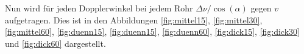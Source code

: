   \begin{table}
    \centering
    \caption{Messdaten und -ergebnisse für das $\SI{16}{\milli\metre}$-Rohr.}
    \label{tab:dick}
    \noindent{}
   \end{table}
Nun wird für jeden Dopplerwinkel bei jedem Rohr $\Delta\nu/\cos(\alpha)$ gegen $v$ aufgetragen.
Dies ist in den Abbildungen \ref{fig:mittel15}, \ref{fig:mittel30}, \ref{fig:mittel60}, \ref{fig:duenn15}, \ref{fig:duenn15}, \ref{fig:duenn60},
\ref{fig:dick15}, \ref{fig:dick30} und \ref{fig:dick60} dargestellt.

